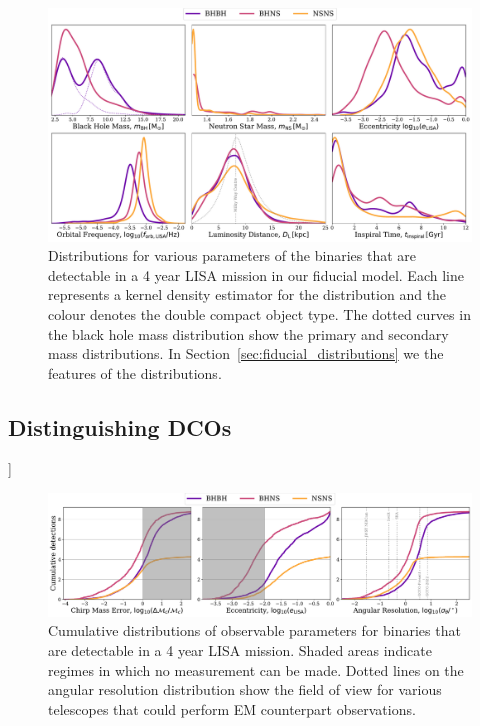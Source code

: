 \documentclass[twocolumn]{aastex63}
\newcommand{\todo}[1]{{\color{red}{[TODO: #1}]}}
\begin{document}
\begin{figure}[htb]
    \centering
    \includegraphics[width=\textwidth]{fiducial_pdf_distributions.pdf}
    \caption{Distributions for various parameters of the binaries that are detectable in a 4 year LISA mission in our fiducial model. Each line represents a kernel density estimator for the distribution and the colour denotes the double compact object type. The dotted curves in the black hole mass distribution show the primary and secondary mass distributions. In Section~\ref{sec:fiducial_distributions} we the features of the distributions.}
    \label{fig:fiducial_pdf_distributions}
\end{figure}

\subsection{Distinguishing DCOs}
\todo{}

\begin{figure}[htb]
    \centering
    \includegraphics[width=\textwidth]{fiducial_cdf_distributions.pdf}
    \caption{Cumulative distributions of observable parameters for binaries that are detectable in a 4 year LISA mission. Shaded areas indicate regimes in which no measurement can be made. Dotted lines on the angular resolution distribution show the field of view for various telescopes that could perform EM counterpart observations.}
    \label{fig:fiducial_cdf_distributions}
\end{figure}
\end{document}
